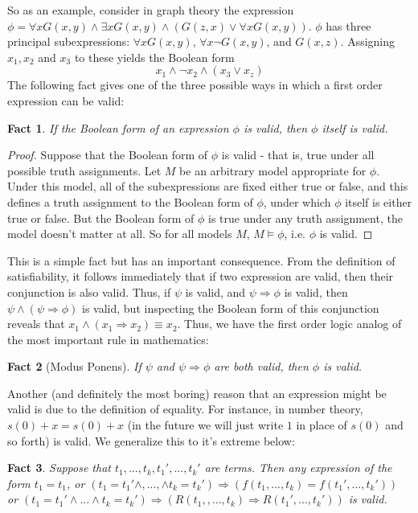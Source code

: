 \documentclass{article}
\theoremstyle{definition}
\theoremstyle{plain}
\theoremstyle{theorem}
\newtheorem{fact}{Fact}[section]
\begin{document}
So as an example, consider in graph theory the expression $\phi = \forall x G(x,y) \wedge \exists x G(x,y) \wedge (G(z,x) \vee \forall x G(x,y))$. $\phi$ has three principal subexpressions: $\forall x G(x,y)$, $\forall x \neg G(x,y)$, and $G(x,z)$. Assigning $x_1,x_2$ and $x_3$ to these yields the Boolean form 
\[ x_1 \wedge \neg x_2 \wedge (x_3 \vee x_z) \]
The following fact gives one of the three possible ways in which a first order expression can be valid:
\begin{fact}
    If the Boolean form of an expression $\phi$ is valid, then $\phi$ itself is valid.
\end{fact}
\begin{proof}
    Suppose that the Boolean form of $\phi$ is valid - that is, true under all possible truth assignments. Let $M$ be an arbitrary model appropriate for $\phi$. Under this model, all of the subexpressions are fixed either true or false, and this defines a truth assignment to the Boolean form of $\phi$, under which $\phi$ itself is either true or false. But the Boolean form of $\phi$ is true under any truth assignment, the model doesn't matter at all. So for all models $M$, $M \models \phi$, i.e. $\phi$ is valid.
\end{proof}
This is a simple fact but has an important consequence. From the definition of satisfiability, it follows immediately that if two expression are valid, then their conjunction is also valid. Thus, if $\psi$ is valid, and $\psi \Rightarrow \phi$ is valid, then $\psi \wedge (\psi \Rightarrow \phi)$ is valid, but inspecting the Boolean form of this conjunction reveals that $x_1 \wedge (x_1 \Rightarrow x_2) \equiv x_2$. Thus, we have the first order logic analog of the most important rule in mathematics:
\begin{fact}[Modus Ponens]
    If $\psi$ and $\psi \Rightarrow \phi$ are both valid, then $\phi$ is valid.
\end{fact}
Another (and definitely the most boring) reason that an expression might be valid is due to the definition of equality. For instance, in number theory, $s(0)+x = s(0)+x$ (in the future we will just write $1$ in place of $s(0)$ and so forth) is valid. We generalize this to it's extreme below:
\begin{fact}
    Suppose that $t_1,...,t_k,t_1',...,t_k'$ are terms. Then any expression of the form $t_1 = t_1$, or $(t_1 = t_1' \wedge,...,\wedge t_k = t_k') \Rightarrow (f(t_1,...,t_k) = f(t_1',...,t_k'))$ or $(t_1 = t_1' \wedge ... \wedge t_k = t_k') \Rightarrow (R(t_1,,...,t_k) \Rightarrow R(t_1',...,t_k'))$ is valid. 
\end{fact}
\end{document}
